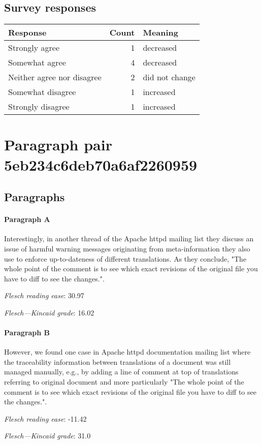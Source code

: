 \subsection{Survey responses}
\begin{tabular}{lrl}
\toprule
          \textbf{Response} &  \textbf{Count} & \textbf{Meaning} \\
\midrule
             Strongly agree &               1 &        decreased \\
             Somewhat agree &               4 &        decreased \\
 Neither agree nor disagree &               2 &   did not change \\
          Somewhat disagree &               1 &        increased \\
          Strongly disagree &               1 &        increased \\
\bottomrule
\end{tabular}

\section{Paragraph pair 5eb234c6deb70a6af2260959}
\subsection{Paragraphs}
\paragraph{Paragraph A}
Interestingly, in another thread of the Apache httpd mailing list they discuss an issue of harmful warning messages originating from meta-information they also use to enforce up-to-dateness of different translations. As they conclude, "The whole point of the comment is to see which exact revisions of the original file you have to diff to see the changes.".\par\medskip
\emph{Flesch reading ease}: 30.97\par
\emph{Flesch---Kincaid grade}: 16.02

\paragraph{Paragraph B}
However, we found one case in Apache httpd documentation mailing list where the traceability information between translations of a document was still managed manually, e.g., by adding a line of comment at top of translations referring to original document and more particularly "The whole point of the comment is to see which exact revisions of the original file you have to diff to see the changes.".\par\medskip
\emph{Flesch reading ease}: -11.42\par
\emph{Flesch---Kincaid grade}: 31.0

